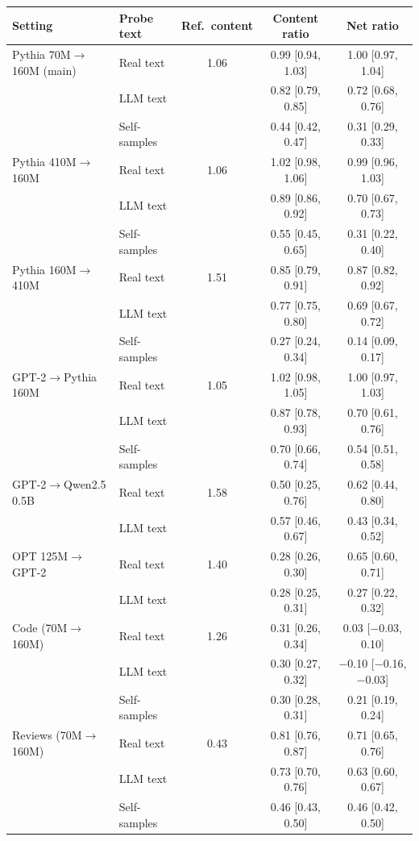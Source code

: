 \begin{tabular}{llccc}
\toprule
Setting & Probe text & Ref.\ content & Content ratio & Net ratio \\
\midrule
Pythia 70M$\to$160M (main) & Real text & 1.06 & 0.99 [0.94, 1.03] & 1.00 [0.97, 1.04] \\
 & LLM text &  & 0.82 [0.79, 0.85] & 0.72 [0.68, 0.76] \\
 & Self-samples &  & 0.44 [0.42, 0.47] & 0.31 [0.29, 0.33] \\
\addlinespace
Pythia 410M$\to$160M & Real text & 1.06 & 1.02 [0.98, 1.06] & 0.99 [0.96, 1.03] \\
 & LLM text &  & 0.89 [0.86, 0.92] & 0.70 [0.67, 0.73] \\
 & Self-samples &  & 0.55 [0.45, 0.65] & 0.31 [0.22, 0.40] \\
\addlinespace
Pythia 160M$\to$410M & Real text & 1.51 & 0.85 [0.79, 0.91] & 0.87 [0.82, 0.92] \\
 & LLM text &  & 0.77 [0.75, 0.80] & 0.69 [0.67, 0.72] \\
 & Self-samples &  & 0.27 [0.24, 0.34] & 0.14 [0.09, 0.17] \\
\addlinespace
GPT-2$\to$Pythia 160M & Real text & 1.05 & 1.02 [0.98, 1.05] & 1.00 [0.97, 1.03] \\
 & LLM text &  & 0.87 [0.78, 0.93] & 0.70 [0.61, 0.76] \\
 & Self-samples &  & 0.70 [0.66, 0.74] & 0.54 [0.51, 0.58] \\
\addlinespace
GPT-2$\to$Qwen2.5 0.5B & Real text & 1.58 & 0.50 [0.25, 0.76] & 0.62 [0.44, 0.80] \\
 & LLM text &  & 0.57 [0.46, 0.67] & 0.43 [0.34, 0.52] \\
\addlinespace
OPT 125M$\to$GPT-2 & Real text & 1.40 & 0.28 [0.26, 0.30] & 0.65 [0.60, 0.71] \\
 & LLM text &  & 0.28 [0.25, 0.31] & 0.27 [0.22, 0.32] \\
\addlinespace
Code (70M$\to$160M) & Real text & 1.26 & 0.31 [0.26, 0.34] & 0.03 [$-$0.03, 0.10] \\
 & LLM text &  & 0.30 [0.27, 0.32] & $-$0.10 [$-$0.16, $-$0.03] \\
 & Self-samples &  & 0.30 [0.28, 0.31] & 0.21 [0.19, 0.24] \\
\addlinespace
Reviews (70M$\to$160M) & Real text & 0.43 & 0.81 [0.76, 0.87] & 0.71 [0.65, 0.76] \\
 & LLM text &  & 0.73 [0.70, 0.76] & 0.63 [0.60, 0.67] \\
 & Self-samples &  & 0.46 [0.43, 0.50] & 0.46 [0.42, 0.50] \\
\bottomrule
\end{tabular}
